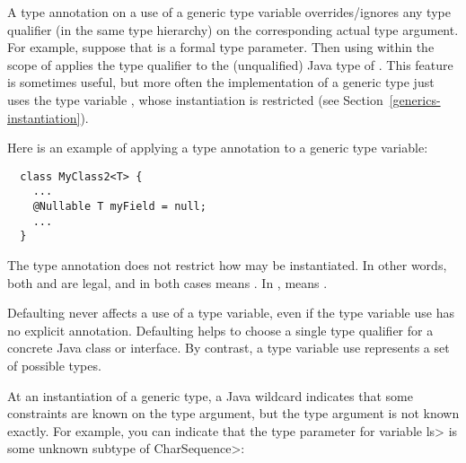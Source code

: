 A type annotation on a use of a generic type variable overrides/ignores any type
qualifier (in the same type hierarchy) on the corresponding actual type
argument.  For example, suppose that  is a formal type parameter.
Then using  within the scope of  applies the type
qualifier  to the (unqualified) Java type of \@.
This feature is sometimes useful, but more often the implementation of a
generic type just uses the type variable , whose instantiation is
restricted (see Section~\ref{generics-instantiation}).

Here is an example of applying a type annotation to a generic type
variable:

\begin{Verbatim}
  class MyClass2<T> {
    ...
    @Nullable T myField = null;
    ...
  }
\end{Verbatim}

\noindent
The type annotation does not restrict how  may be
instantiated.  In other words, both
 and  are
legal, and in both cases  means .
In ,
 means .





Defaulting never affects a use of a type variable, even if the type
variable use has no explicit annotation.  Defaulting helps to choose a
single type qualifier for a concrete Java class or interface.  By contrast,
a type variable use represents a set of possible types.



At an instantiation of a generic type, a Java wildcard indicates that some
constraints are known on the type argument, but the type argument is not known
exactly.
For example, you can indicate that the type parameter for variable \<ls> is
some unknown subtype of \<CharSequence>:

